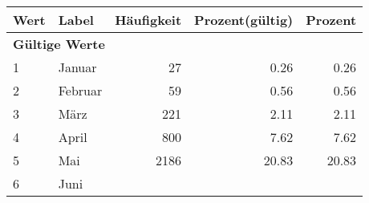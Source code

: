      \begin{longtable}{lXrrr}
     \toprule
     \textbf{Wert} & \textbf{Label} & \textbf{Häufigkeit} & \textbf{Prozent(gültig)} & \textbf{Prozent} \\
     \endhead
     \midrule
     \multicolumn{5}{l}{\textbf{Gültige Werte}}\\

     1 &
     \multicolumn{1}{X}{ Januar   } &


       \num{27} &
       \num[round-mode=places,round-precision=2]{0,26} &
         \num[round-mode=places,round-precision=2]{0,26} \\

     2 &
     \multicolumn{1}{X}{ Februar   } &


       \num{59} &
       \num[round-mode=places,round-precision=2]{0,56} &
         \num[round-mode=places,round-precision=2]{0,56} \\

     3 &
     \multicolumn{1}{X}{ März   } &


       \num{221} &
       \num[round-mode=places,round-precision=2]{2,11} &
         \num[round-mode=places,round-precision=2]{2,11} \\

     4 &
     \multicolumn{1}{X}{ April   } &


       \num{800} &
       \num[round-mode=places,round-precision=2]{7,62} &
         \num[round-mode=places,round-precision=2]{7,62} \\

     5 &
     \multicolumn{1}{X}{ Mai   } &


       \num{2186} &
       \num[round-mode=places,round-precision=2]{20,83} &
         \num[round-mode=places,round-precision=2]{20,83} \\

     6 &
     \multicolumn{1}{X}{ Juni   } &



\end{longtable}
